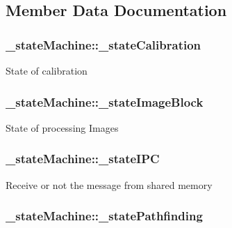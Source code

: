 \subsection{Member Data Documentation}
\hypertarget{struct__state_machine_a157036ced733a021849ebcbc98c27200}{
\subsubsection[{\-\_\-state\-Calibration}]{ \-\_\-state\-Machine\-::\-\_\-state\-Calibration}}\label{struct__state_machine_a157036ced733a021849ebcbc98c27200}
State of calibration \hypertarget{struct__state_machine_adbc0e51d4bed9b6da5c44e921e37dc32}{
\subsubsection[{\-\_\-state\-Image\-Block}]{ \-\_\-state\-Machine\-::\-\_\-state\-Image\-Block}}\label{struct__state_machine_adbc0e51d4bed9b6da5c44e921e37dc32}
State of processing Images \hypertarget{struct__state_machine_aa6cc70d0567b403fb9e993a681f48b85}{
\subsubsection[{\-\_\-state\-I\-P\-C}]{ \-\_\-state\-Machine\-::\-\_\-state\-I\-P\-C}}\label{struct__state_machine_aa6cc70d0567b403fb9e993a681f48b85}
Receive or not the message from shared memory \hypertarget{struct__state_machine_a79ce614ae01c3759d155c03026384ca7}{
\subsubsection[{\-\_\-state\-Pathfinding}]{ \-\_\-state\-Machine\-::\-\_\-state\-Pathfinding}}\label{struct__state_machine_a79ce614ae01c3759d155c03026384ca7}
